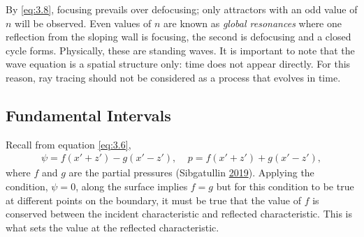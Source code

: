 \documentclass[a4paper]{article}
\numberwithin{equation}{section}
\begin{document}
By \eqref{eq:3.8}, focusing prevails over defocusing; only attractors with an odd value of $n$ will be observed. Even values of $n$ are known as \emph{global resonances} where one reflection from the sloping wall is focusing, the second is defocusing and a closed cycle forms. Physically, these are standing waves. It is important to note that the wave equation is a spatial structure only: time does not appear directly. For this reason, ray tracing should not be considered as a process that evolves in time. 

\subsection{Fundamental Intervals}
Recall from equation \eqref{eq:3.6}, 
\begin{align}
\psi = f(x'+z') - g(x'-z'), ~~~~~ p = f(x'+z') + g(x'-z'),
\end{align}
where $f$ and $g$ are the partial pressures (Sibgatullin \hyperlink{ref 19}{2019}). Applying the condition, $\psi = 0$, along the surface implies $f = g$ but for this condition to be true at different points on the boundary, it must be true that the value of $f$ is conserved between the incident characteristic and reflected characteristic. This is what sets the value at the reflected characteristic. 
\end{document}
